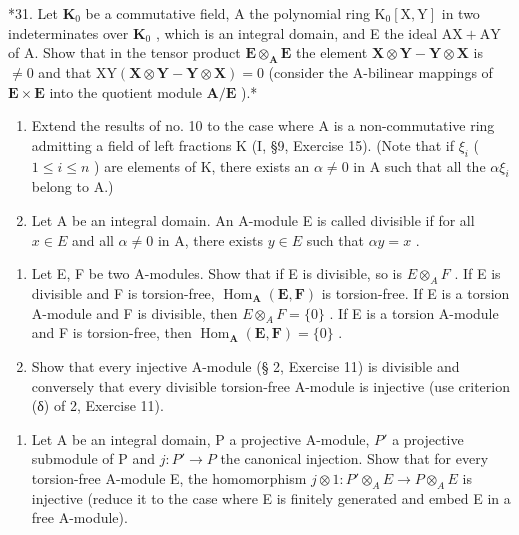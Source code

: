 *31. Let \(\mathbf{K}_0\) be a commutative field, A the polynomial ring \(\mathrm{K}_0[\mathrm{X},\mathrm{Y}]\) in two indeterminates over \(\mathbf{K}_0\) , which is an integral domain, and E the ideal \(\mathrm{AX} + \mathrm{AY}\) of A. Show that in the tensor product \(\mathbf{E} \otimes_{\mathbf{A}} \mathbf{E}\) the element \(\mathbf{X} \otimes \mathbf{Y} - \mathbf{Y} \otimes \mathbf{X}\) is \(\neq 0\) and that \(\mathrm{XY}(\mathbf{X} \otimes \mathbf{Y} - \mathbf{Y} \otimes \mathbf{X}) = 0\) (consider the A-bilinear mappings of \(\mathbf{E} \times \mathbf{E}\) into the quotient module \(\mathbf{A}/\mathbf{E}\) ).*

\begin{enumerate}
\def\labelenumi{\arabic{enumi}.}
\setcounter{enumi}{31}
\item
  Extend the results of no. 10 to the case where A is a non-commutative ring admitting a field of left fractions K (I, §9, Exercise 15). (Note that if \(\xi_{i}\) ( \(1 \leqslant i \leqslant n\) ) are elements of K, there exists an \(\alpha \neq 0\) in A such that all the \(\alpha\xi_{i}\) belong to A.)
\item
  Let A be an integral domain. An A-module E is called divisible if for all \(x \in E\) and all \(\alpha \neq 0\) in A, there exists \(y \in E\) such that \(\alpha y = x\) .
\end{enumerate}

\begin{enumerate}
\def\labelenumi{(\alph{enumi})}
\item
  Let E, F be two A-modules. Show that if E is divisible, so is \(E \otimes_{A} F\) . If E is divisible and F is torsion-free, \(\operatorname{Hom}_{\mathbf{A}}(\mathbf{E}, \mathbf{F})\) is torsion-free. If E is a torsion A-module and F is divisible, then \(E \otimes_{A} F = \{0\}\) . If E is a torsion A-module and F is torsion-free, then \(\operatorname{Hom}_{\mathbf{A}}(\mathbf{E}, \mathbf{F}) = \{0\}\) .
\item
  Show that every injective A-module (§ 2, Exercise 11) is divisible and conversely that every divisible torsion-free A-module is injective (use criterion (δ) of 2, Exercise 11).
\end{enumerate}

\begin{enumerate}
\def\labelenumi{\arabic{enumi}.}
\setcounter{enumi}{33}
\tightlist
\item
  Let A be an integral domain, P a projective A-module, \(P'\) a projective submodule of P and \(j: P' \to P\) the canonical injection. Show that for every torsion-free A-module E, the homomorphism \(j \otimes 1: P' \otimes_{A} E \to P \otimes_{A} E\) is injective (reduce it to the case where E is finitely generated and embed E in a free A-module).
\end{enumerate}

